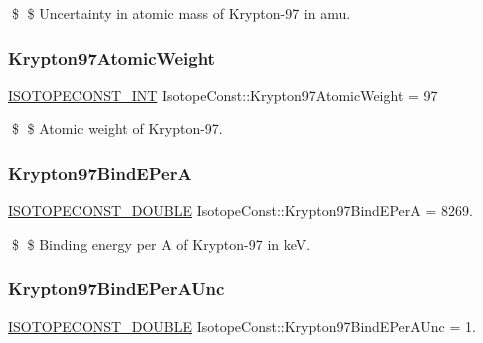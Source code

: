 \$ \$ Uncertainty in atomic mass of Krypton-\/97 in amu. \mbox{\label{group___isotope_const-_krypton-_kr97_gae768e237fb1cbc2e1e42ca913167f285}} 
\subsubsection{\texorpdfstring{Krypton97\+Atomic\+Weight}{Krypton97AtomicWeight}}
{\footnotesize\ttfamily \mbox{\hyperlink{group___isotope_const-_macros_ga5f18360b3e99483a35c32d789e62621c}{I\+S\+O\+T\+O\+P\+E\+C\+O\+N\+S\+T\+\_\+\+I\+NT}} Isotope\+Const\+::\+Krypton97\+Atomic\+Weight = 97}

\$ \$ Atomic weight of Krypton-\/97. \mbox{\label{group___isotope_const-_krypton-_kr97_ga2eb62be172c59f3adab6e31b98d8b506}} 
\subsubsection{\texorpdfstring{Krypton97\+Bind\+E\+PerA}{Krypton97BindEPerA}}
{\footnotesize\ttfamily \mbox{\hyperlink{group___isotope_const-_macros_ga8f45a7272ce02c0b4c65c44636ed719a}{I\+S\+O\+T\+O\+P\+E\+C\+O\+N\+S\+T\+\_\+\+D\+O\+U\+B\+LE}} Isotope\+Const\+::\+Krypton97\+Bind\+E\+PerA = 8269.}

\$ \$ Binding energy per A of Krypton-\/97 in keV. \mbox{\label{group___isotope_const-_krypton-_kr97_ga2f74cceac338647e6f129e446c7e43c1}} 
\subsubsection{\texorpdfstring{Krypton97\+Bind\+E\+Per\+A\+Unc}{Krypton97BindEPerAUnc}}
{\footnotesize\ttfamily \mbox{\hyperlink{group___isotope_const-_macros_ga8f45a7272ce02c0b4c65c44636ed719a}{I\+S\+O\+T\+O\+P\+E\+C\+O\+N\+S\+T\+\_\+\+D\+O\+U\+B\+LE}} Isotope\+Const\+::\+Krypton97\+Bind\+E\+Per\+A\+Unc = 1.}

